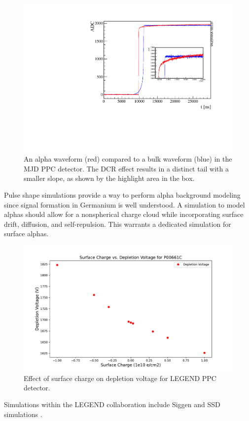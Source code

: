 \begin{figure}[!htb]
\centering
  \includegraphics[width=0.95\linewidth]{ch3/figs/dcr_waveform.pdf}
 \caption{An alpha waveform (red) compared to a bulk waveform (blue) in the MJD PPC detector. The DCR effect results in a distinct tail with a smaller slope, as shown by the highlight area in the box.\cite{tube_paper}}
\label{fig:dcr_waveform}
  \end{figure}

Pulse shape simulations provide a way to perform alpha background modeling since signal formation in Germanium is well understood. A simulation to model alphas should allow for a nonspherical charge cloud while incorporating surface drift, diffusion, and self-repulsion. This warrants a dedicated simulation for surface alphas.


\begin{figure}[!htb]
\centering
  \includegraphics[width=0.99\linewidth]{ch3/figs/deplep_sc.pdf}
 \caption{Effect of surface charge on depletion voltage for LEGEND PPC detector.}
\label{ch3:fig:deplection_sc}
  \end{figure}
Simulations within the LEGEND collaboration include Siggen \cite{siggen_paper} and SSD simulations \cite{Abt:2021SSD}.

